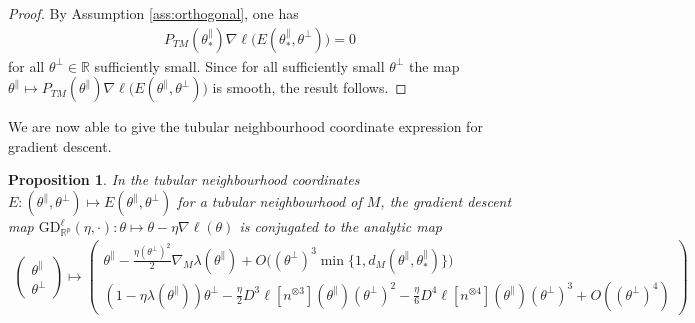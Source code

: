 \documentclass{article}
\newcommand{\RB}{\mathbb{R}}
\newcommand{\tpa}{\theta^{\parallel}}
\newcommand{\tpe}{\theta^{\perp}}
\newcommand{\GD}{\mathrm{GD}}
\theoremstyle{plain}
\newtheorem{proposition}[theorem]{Proposition}
\theoremstyle{definition}
\theoremstyle{remark}
\begin{document}
\begin{proof}
    By Assumption \ref{ass:orthogonal}, one has
    \begin{align}
        P_{TM}(\tpa_*)\nabla\ell\big(E(\tpa_*,\tpe)\big) = 0
    \end{align}
    for all $\tpe\in\RB$ sufficiently small. Since for all sufficiently small $\tpe$ the map $\tpa\mapsto P_{TM}(\tpa)\nabla\ell\big(E(\tpa,\tpe)\big)$ is smooth, the result follows.
\end{proof}

We are now able to give the tubular neighbourhood coordinate expression for gradient descent.

\begin{proposition}\label{prop:tubnbrhdcoords}
    In the tubular neighbourhood coordinates $E:(\tpa,\tpe)\mapsto E(\tpa,\tpe)$ for a tubular neighbourhood of $M$, the gradient descent map $\GD_{\RB^p}^{\ell}(\eta,\cdot):\theta\mapsto \theta-\eta\nabla\ell(\theta)$ is conjugated to the analytic map
    \begin{align}
        \begin{pmatrix} \tpa\\ \tpe\end{pmatrix}\mapsto \begin{pmatrix} \tpa-\frac{\eta(\tpe)^2}{2}\nabla_M\lambda(\tpa) + O\big((\tpe)^3\min\{1,d_M(\tpa,\tpa_*)\}\big) \\ (1-\eta\lambda(\tpa))\tpe-\frac{\eta}{2}D^3\ell[n^{\otimes 3}](\tpa)(\tpe)^2 - \frac{\eta}{6}D^4\ell[n^{\otimes 4}](\tpa)(\tpe)^3 + O((\tpe)^4)\end{pmatrix}\label{eq:tubecoords}
    \end{align}
\end{proposition}
\end{document}
